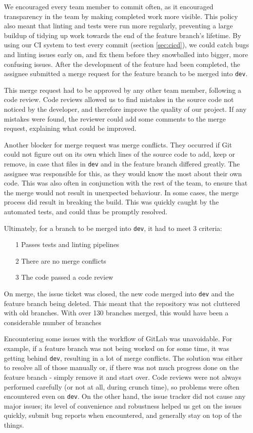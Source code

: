 \documentclass{l3proj}
\begin{document}
We encouraged every team member to commit often, as it encouraged transparency
 in the team by making completed work more visible. This policy also meant 
 that linting and tests were run more regularly, preventing a large buildup
 of tidying up work towards the end of the feature branch's lifetime.
 By using our CI system to test every commit (section \ref{sec:cicd}), we could
 catch bugs and linting issues early on, and fix them before they snowballed into
 bigger, more confusing issues. After the development of the feature had been completed, the assignee
 submitted a merge request for the feature branch to be merged into \texttt{dev}.
 
This merge request had to be approved by any other team member, following a
 code review. Code reviews allowed us to find mistakes in the source code not
 noticed by the developer, and therefore improve the quality of our project.
 If any mistakes were found, the reviewer could add some comments to the merge
 request, explaining what could be improved. 
 
Another blocker for merge request was merge conflicts. They occurred if Git could not
 figure out on its own which lines of the source code to add, keep or
 remove, in case that files in \texttt{dev} and in the feature branch differed
 greatly. The assignee was responsible for this, as they would know the most about their
 own code. This was also often in conjunction with the rest of the team, to ensure that the merge
 would not result in unexpected behaviour. In some cases, the merge process did result
 in breaking the build. This was quickly caught by the automated tests, and could
 thus be promptly resolved. 
 
Ultimately, for a branch to be merged into \texttt{dev}, it had to meet 3 criteria:
\begin{itemize}
\item[1] Passes tests and linting pipelines
\item[2] There are no merge conflicts
\item[3] The code passed a code review
\end{itemize}
On merge, the issue ticket was closed, the new code merged into \texttt{dev}
 and the feature branch being deleted. This meant that the repository was not 
 cluttered with old branches. With over 130 branches merged, this would have been
 a considerable number of branches

Encountering some issues with the workflow of GitLab was unavoidable.
 For example, if a feature branch was not being worked on for some time,
 it was getting behind \texttt{dev}, resulting in a lot of merge conflicts.
 The solution was either to resolve all of those manually or, if
 there was not much progress done on the feature branch - simply remove
 it and start over. Code reviews were not always performed carefully
 (or not at all, during crunch time), so problems were often encountered
 even on \texttt{dev}. On the other hand, the issue tracker did not
 cause any major issues; its level of convenience and robustness helped
 us get on the issues quickly, submit bug reports when encountered,
 and generally stay on top of the things.
\end{document}
